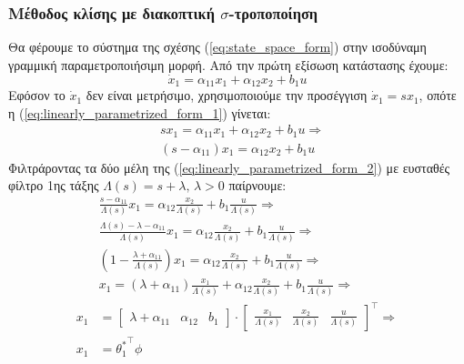 \documentclass[a4paper,12pt]{article}
\begin{document}
\subsubsection*{Μέθοδος κλίσης με διακοπτική $\sigma$-τροποποίηση}

Θα φέρουμε το σύστημα της σχέσης (\ref{eq:state_space_form}) στην ισοδύναμη γραμμική παραμετροποιήσιμη 
μορφή. Από την πρώτη εξίσωση κατάστασης έχουμε:
\begin{equation}
    \dot{x}_1 = \alpha_{11} x_1 + \alpha_{12} x_2 + b_1 u
    \label{eq:linearly_parametrized_form_1}
\end{equation}
Εφόσον το $\dot{x}_1$ δεν είναι μετρήσιμο, χρησιμοποιούμε την προσέγγιση $\dot{x}_1 = s x_1$, οπότε η
(\ref{eq:linearly_parametrized_form_1}) γίνεται:
\begin{equation}
    \begin{aligned}
        &s x_1 = \alpha_{11} x_1 + \alpha_{12} x_2 + b_1 u \Rightarrow \\ 
        &(s - \alpha_{11}) x_1 = \alpha_{12} x_2 + b_1 u
    \end{aligned}
    \label{eq:linearly_parametrized_form_2}
\end{equation}
Φιλτράροντας τα δύο μέλη της (\ref{eq:linearly_parametrized_form_2}) με ευσταθές φίλτρο 1ης τάξης
$\Lambda(s) = s + \lambda, \, \lambda > 0$ παίρνουμε:
\begin{equation*}
    \begin{aligned}
        &\frac{s - \alpha_{11}}{\Lambda(s)} x_1 = \alpha_{12} \frac{x_2}{\Lambda(s)} + 
        b_1 \frac{u}{\Lambda(s)} \Rightarrow \\
        &\frac{\Lambda(s) - \lambda - \alpha_{11}}{\Lambda(s)} x_1 = \alpha_{12} \frac{x_2}{\Lambda(s)} + 
        b_1 \frac{u}{\Lambda(s)} \Rightarrow \\
        &\left(1 - \frac{\lambda + \alpha_{11}}{\Lambda(s)}\right) x_1 = \alpha_{12} \frac{x_2}{\Lambda(s)} + 
        b_1 \frac{u}{\Lambda(s)} \Rightarrow \\
        &x_1 = (\lambda + \alpha_{11})\frac{x_1}{\Lambda(s)} + \alpha_{12} \frac{x_2}{\Lambda(s)} + 
        b_1 \frac{u}{\Lambda(s)} \Rightarrow \\
        x_1 &=
        \begin{bmatrix}
            \lambda + \alpha_{11} & \alpha_{12} & b_1
        \end{bmatrix} \cdot
        \begin{bmatrix}
            \frac{x_1}{\Lambda(s)} & \frac{x_2}{\Lambda(s)} & \frac{u}{\Lambda(s)}
        \end{bmatrix}^{\top} \Rightarrow \\
        x_1 &= {\theta_1^*}^{\top} \phi
    \end{aligned} 
\end{equation*}
\end{document}

